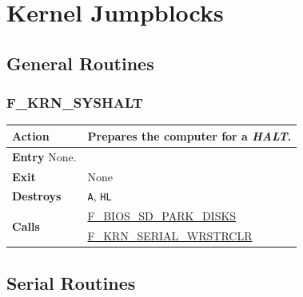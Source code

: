\documentclass[a4paper,11pt]{article}
\begin{document}
    \pagebreak
    \section{Kernel Jumpblocks}

    \subsection{General Routines}

     \subsubsection{F\_KRN\_SYSHALT}
     \label{func:fkrnsyshalt}
     \begin{tabular}{l p{9cm}}
         \hline\multirow[t]{4}{4em}{\textbf{Action}}
         & Prepares the computer for a \textit{HALT}.\\
         \hline\textbf{Entry} None.\\
         \hline\textbf{Exit} & None \\
         \hline\textbf{Destroys} & \texttt{A}, \texttt{HL} \\
         \hline\multirow[t]{2}{4em}{\textbf{Calls}}
         & \hyperref[func:fbiossdparkdisks]{F\_BIOS\_SD\_PARK\_DISKS}\\
         & \hyperref[func:fkrnserialwrstrclr]{F\_KRN\_SERIAL\_WRSTRCLR}\\
         \hline
     \end{tabular}

    \subsection{Serial Routines}

\end{document}
